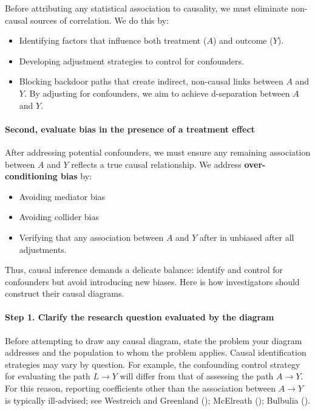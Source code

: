 \documentclass[
  single column]{article}
\let\oldparagraph\paragraph
\renewcommand{\paragraph}[1]{\oldparagraph{#1}\mbox{}}
\providecommand{\tightlist}{%
  \setlength{\itemsep}{0pt}\setlength{\parskip}{0pt}}\usepackage{longtable,booktabs,array}
\begin{document}
Before attributing any statistical association to causality, we must
eliminate non-causal sources of correlation. We do this by:

\begin{itemize}
\tightlist
\item
  Identifying factors that influence both treatment (\(A\)) and outcome
  (\(Y\)).
\item
  Developing adjustment strategies to control for confounders.
\item
  Blocking backdoor paths that create indirect, non-causal links between
  \(A\) and \(Y\). By adjusting for confounders, we aim to achieve
  d-separation between \(A\) and \(Y\).
\end{itemize}

\paragraph{Second, evaluate bias in the presence of a treatment
effect}\label{second-evaluate-bias-in-the-presence-of-a-treatment-effect}

After addressing potential confounders, we must ensure any remaining
association between \(A\) and \(Y\) reflects a true causal relationship.
We address \textbf{over-conditioning bias} by:

\begin{itemize}
\tightlist
\item
  Avoiding mediator bias
\item
  Avoiding collider bias
\item
  Verifying that any association between \(A\) and \(Y\) after in
  unbiased after all adjustments.
\end{itemize}

Thus, causal inference demands a delicate balance: identify and control
for confounders but avoid introducing new biases. Here is how
investigators should construct their causal diagrams.

\paragraph{Step 1. Clarify the research question evaluated by the
diagram}\label{step-1.-clarify-the-research-question-evaluated-by-the-diagram}

Before attempting to draw any causal diagram, state the problem your
diagram addresses and the population to whom the problem applies. Causal
identification strategies may vary by question. For example, the
confounding control strategy for evaluating the path \(L\to Y\) will
differ from that of assessing the path \(A\to Y\). For this reason,
reporting coefficients other than the association between \(A \to Y\) is
typically ill-advised; see Westreich and Greenland
(); McElreath
(); Bulbulia
().
\end{document}
